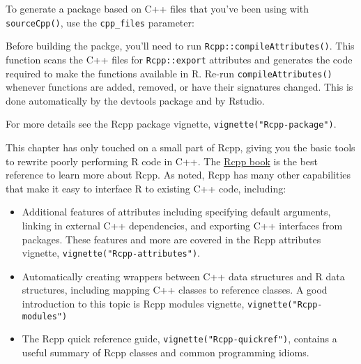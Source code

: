 To generate a package based on C++ files that you've been using with
\texttt{sourceCpp()}, use the \texttt{cpp\_files} parameter:

\begin{Shaded}
\begin{Highlighting}[]
\NormalTok{(}\NormalTok{, } \NormalTok{,}
                       \NormalTok{(}\NormalTok{))}
\end{Highlighting}
\end{Shaded}

Before building the packge, you'll need to run
\texttt{Rcpp::compileAttributes()}. This function scans the C++ files
for \texttt{Rcpp::export} attributes and generates the code required to
make the functions available in R. Re-run \texttt{compileAttributes()}
whenever functions are added, removed, or have their signatures changed.
This is done automatically by the devtools package and by Rstudio.

For more details see the Rcpp package vignette,
\texttt{vignette("Rcpp-package")}.


This chapter has only touched on a small part of Rcpp, giving you the
basic tools to rewrite poorly performing R code in C++. The
\href{http://www.rcpp.org/book}{Rcpp book} is the best reference to
learn more about Rcpp. As noted, Rcpp has many other capabilities that
make it easy to interface R to existing C++ code, including:

\begin{itemize}
\item
  Additional features of attributes including specifying default
  arguments, linking in external C++ dependencies, and exporting C++
  interfaces from packages. These features and more are covered in the
  Rcpp attributes vignette, \texttt{vignette("Rcpp-attributes")}.
\item
  Automatically creating wrappers between C++ data structures and R data
  structures, including mapping C++ classes to reference classes. A good
  introduction to this topic is Rcpp modules vignette,
  \texttt{vignette("Rcpp-modules")}
\item
  The Rcpp quick reference guide, \texttt{vignette("Rcpp-quickref")},
  contains a useful summary of Rcpp classes and common programming
  idioms.
\end{itemize}

